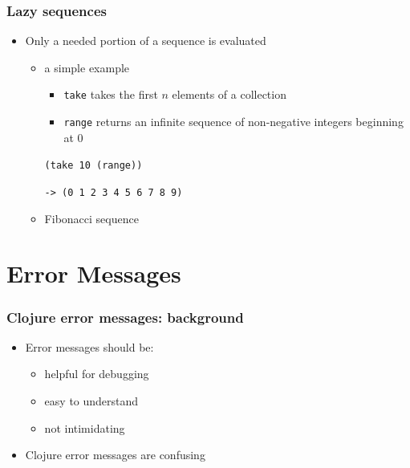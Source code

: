 \documentclass{beamer}
\begin{document}
\begin{frame}[fragile]
\frametitle{Lazy sequences}
	\begin{itemize}
  	  \item Only a needed portion of a sequence is evaluated
		\begin{itemize}
  	      \item a simple example
  	        \begin{itemize}
  	          \item \texttt{take} takes the first $n$ elements of a collection
  	          \item \texttt{range} returns an infinite sequence of non-negative integers beginning at 0
  	        \end{itemize}
  	      \texttt{(take 10 (range))}
  	 	      
  	 	  \texttt{-> (0 1 2 3 4 5 6 7 8 9)}
  	      \item Fibonacci sequence
  	    \end{itemize}
   \end{itemize}
\end{frame}

\section{Error Messages}

\begin{frame}
\frametitle{Clojure error messages: background}
	\begin{itemize}
  		\item Error messages should be:
  		\begin{itemize}
  	 		\item helpful for debugging
  	 		\item easy to understand
  	 		\item not intimidating
  		\end{itemize}
  		\item Clojure error messages are confusing
	 \end{itemize}
	 
\end{frame}
\end{document}
